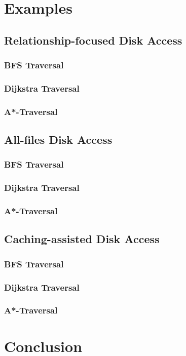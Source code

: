 \documentclass[a4paper,10pt]{article}
\begin{document}
\section{Examples}
\subsection{Relationship-focused Disk Access}
    \subsubsection{BFS Traversal}

    \subsubsection{Dijkstra Traversal}

    \subsubsection{A*-Traversal}

\subsection{All-files Disk Access}
 \subsubsection{BFS Traversal}

    \subsubsection{Dijkstra Traversal}

    \subsubsection{A*-Traversal}

\subsection{Caching-assisted Disk Access}
 \subsubsection{BFS Traversal}

    \subsubsection{Dijkstra Traversal}

    \subsubsection{A*-Traversal}


\section{Conclusion}
\end{document}
